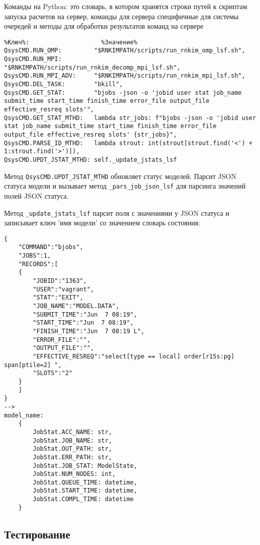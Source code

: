 Команды на Python: это словарь, в котором хранятся строки путей к скриптам запуска расчетов на сервер, команды для сервера специфичные для системы очередей и методы для обработки результатов команд на сервере
\begin{lstlisting}
%Ключ%:                    %Значение%
QsysCMD.RUN_OMP:         "$RNKIMPATH/scripts/run_rnkim_omp_lsf.sh",
QsysCMD.RUN_MPI:         "$RNKIMPATH/scripts/run_rnkim_decomp_mpi_lsf.sh",
QsysCMD.RUN_MPI_ADV:     "$RNKIMPATH/scripts/run_rnkim_mpi_lsf.sh",
QsysCMD.DEL_TASK:        "bkill",
QsysCMD.GET_STAT:        "bjobs -json -o 'jobid user stat job_name submit_time start_time finish_time error_file output_file effective_resreq slots'",
QsysCMD.GET_STAT_MTHD:   lambda str_jobs: f"bjobs -json -o 'jobid user stat job_name submit_time start_time finish_time error_file output_file effective_resreq slots' {str_jobs}",
QsysCMD.PARSE_ID_MTHD:   lambda strout: int(strout[strout.find('<') + 1:strout.find('>')]),
QsysCMD.UPDT_JSTAT_MTHD: self._update_jstats_lsf
\end{lstlisting}

Метод \lstinline{QsysCMD.UPDT_JSTAT_MTHD} обновляет статус моделей. Парсит JSON статуса модели и вызывает метод \lstinline{_pars_job_json_lsf} для парсинга значений полей JSON статуса.

Метод \lstinline{_update_jstats_lsf} парсит поля с значениями у JSON статуса и записывает ключ 'имя модели' со значением словарь состояния:
\begin{lstlisting}
{
    "COMMAND":"bjobs",
    "JOBS":1,
    "RECORDS":[
    {
        "JOBID":"1363",
        "USER":"vagrant",
        "STAT":"EXIT",
        "JOB_NAME":"MODEL.DATA",
        "SUBMIT_TIME":"Jun  7 08:19",
        "START_TIME":"Jun  7 08:19",
        "FINISH_TIME":"Jun  7 08:19 L",
        "ERROR_FILE":"",
        "OUTPUT_FILE":"",
        "EFFECTIVE_RESREQ":"select[type == local] order[r15s:pg] span[ptile=2] ",
        "SLOTS":"2"
    }
    ]
}
-->
model_name:
    {
        JobStat.ACC_NAME: str,
        JobStat.JOB_NAME: str,
        JobStat.OUT_PATH: str,
        JobStat.ERR_PATH: str,
        JobStat.JOB_STAT: ModelState,
        JobStat.NUM_NODES: int,
        JobStat.QUEUE_TIME: datetime,
        JobStat.START_TIME: datetime,
        JobStat.COMPL_TIME: datetime
    }
\end{lstlisting}


\subsection{Тестирование}

